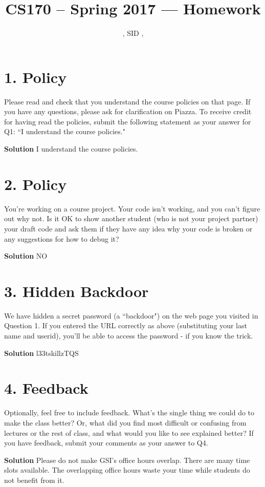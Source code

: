 \documentclass[11pt]{article}
\title{CS170 -- Spring 2017 --- Homework \Homework}
\author{\Name, SID \SID, \texttt{\Login}}
\date{}
\newenvironment{solution}{\begin{mdframed}\textbf{Solution}}{\end{mdframed}}
\begin{document}
\maketitle

\section*{1. Policy}
Please read and check that you understand the course policies on that page. If you have any questions, please ask for clarification on Piazza. To receive credit for having read the policies, submit the following statement as your
answer for Q1: ``I understand the course policies."
\begin{solution}
I understand the course policies.
\end{solution}

\section*{2. Policy}
You're working on a course project. Your code isn't working, and you can't figure out why not. Is it OK to show another student (who is not your project partner) your draft code and ask them if they have any idea why your code is broken or any suggestions for how to debug it?
\begin{solution}
NO
\end{solution}

\section*{3. Hidden Backdoor}
We have hidden a secret password (a ``backdoor") on the web page you visited in Question 1. If you entered the URL correctly as above (substituting your last name and userid), you'll be able to access the password - if you know the trick.
\begin{solution}
l33tskillzTQS
\end{solution}

\section*{4. Feedback}
Optionally, feel free to include feedback. What's the single thing we could do to make the class better? Or, what did you find most difficult or confusing from lectures or the rest of class, and what would you like to see explained better? If you have feedback, submit your comments as your answer to Q4.
\begin{solution}
Please do not make GSI's office hours overlap. There are many time slots available. The overlapping office hours waste your time while students do not benefit from it.
\end{solution}
\end{document}
